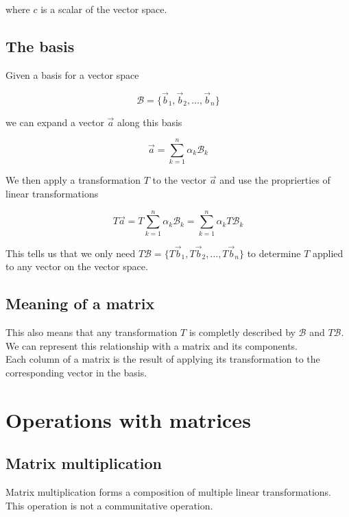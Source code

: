 \documentclass{article}
\begin{document}
where \(c\) is a scalar of the vector space.

\subsection{The basis}

Given a basis for a vector space

\[
    \mathcal{B}=\{\vec{b}_1, \vec{b}_2, \ldots, \vec{b}_n\}
\]

we can expand a vector \(\vec{a}\) along this basis

\[
    \vec{a} = \sum_{k=1}^{n} \alpha_k \mathcal{B}_k
\]

We then apply a transformation \(T\) to the vector \(\vec{a}\) and use the proprierties of linear transformations

\[
    T\vec{a}
    = T\sum_{k=1}^{n} \alpha_k \mathcal{B}_k
    = \sum_{k=1}^{n} \alpha_k T\mathcal{B}_k
\]

This tells us that we only need \(T\mathcal{B}=\{T\vec{b}_1, T\vec{b}_2, \ldots, T\vec{b}_n\}\)
to determine \(T\) applied to any vector on the vector space.

\subsection{Meaning of a matrix}

This also means that any transformation \(T\) is completly described by \(\mathcal{B}\)
and \(T\mathcal{B}\). We can represent this relationship with a matrix and its components. \\

Each column of a matrix is the result of applying its transformation to the corresponding vector in the basis.

%
%

\pagebreak

\section{Operations with matrices}

\subsection{Matrix multiplication}

Matrix multiplication forms a composition of multiple linear transformations. \\
This operation is not a communitative operation.
\end{document}
